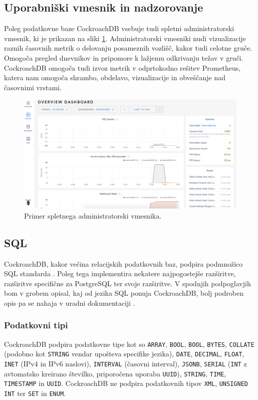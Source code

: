 \documentclass[a4paper, 12pt]{book}
\begin{document}
\subsection{Uporabniški vmesnik in nadzorovanje}
Poleg podatkovne baze CockroachDB vsebuje tudi spletni administratorski vmesnik, ki je prikazan na sliki \ref{img_crdb_admin_ui}. Administratorski vmesniki nudi vizualizacije raznih časovnih metrik o delovanju posameznih vozlišč, kakor tudi celotne gruče. Omogoča pregled dnevnikov in pripomore k lažjemu odkrivanju težav v gruči. CockroachDB omogoča tudi izvoz metrik v odprtokodno rešitev Prometheus, katera nam omogoča shrambo, obdelavo, vizualizacije in obveščanje nad časovnimi vrstami.

\begin{figure}[H]
\begin{center}
\includegraphics[width=1\textwidth]{resources/crdb_admin_ui.png}
\end{center}
\caption{Primer spletnega administratorski vmesnika.}
\label{img_crdb_admin_ui}
\end{figure}

\subsection{SQL}
CockroachDB, kakor večina relacijskih podatkovnih baz, podpira podmnožico SQL standarda \cite{CRDB-sql-standard}. Poleg tega implementira nekatere najpogostejše raz\-ši\-rit\-ve, razširitve specifične za PostgreSQL ter svoje razširitve. V spodnjih podpoglavjih bom v grobem opisal, kaj od jezika SQL ponuja CockroachDB, bolj podroben opis pa se nahaja v uradni dokumentaciji \cite{CRDB-sql-features}.

\subsubsection{Podatkovni tipi}
CockroachDB podpira podatkovne tipe kot so \texttt{ARRAY}, \texttt{BOOL}, \texttt{BOOL}, \texttt{BYTES}, \texttt{COLLATE} (podobno kot \texttt{STRING} vendar upošteva specifike jezika), \texttt{DATE}, \texttt{DE\-CI\-MAL}, \texttt{FLOAT}, \texttt{INET} (IPv4 in IPv6 naslovi), \texttt{INTERVAL} (časovni interval), \texttt{JSONB}, \texttt{SERIAL} (\texttt{INT} z avtomatsko kreirano številko, priporočena uporaba \texttt{UUID}), \texttt{STRING}, \texttt{TIME}, \texttt{TIMESTAMP} in \texttt{UUID}. CockroachDB ne podpira podatkovnih tipov \texttt{XML}, \texttt{UNSIGNED INT} ter \texttt{SET} in \texttt{ENUM}.
\end{document}
